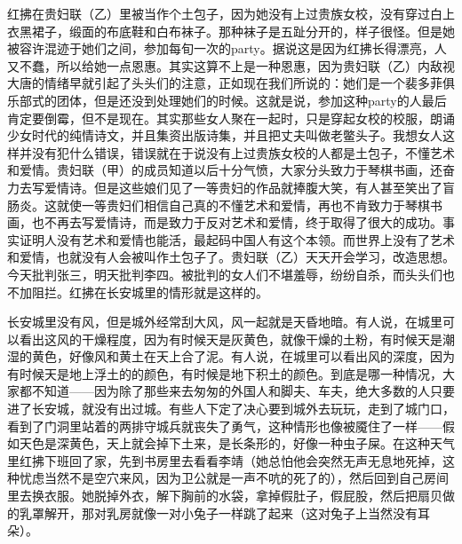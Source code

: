 红拂在贵妇联（乙）里被当作个土包子，因为她没有上过贵族女校，没有穿过白上衣黑裙子，缎面的布底鞋和白布袜子。那种袜子是五趾分开的，样子很怪。但是她被容许混迹于她们之间，参加每旬一次的party。据说这是因为红拂长得漂亮，人又不蠢，所以给她一点恩惠。其实这算不上是一种恩惠，因为贵妇联（乙）内敌视大唐的情绪早就引起了头头们的注意，正如现在我们所说的：她们是一个裴多菲俱乐部式的团体，但是还没到处理她们的时候。这就是说，参加这种party的人最后肯定要倒霉，但不是现在。其实那些女人聚在一起时，只是穿起女校的校服，朗诵少女时代的纯情诗文，并且集资出版诗集，并且把丈夫叫做老鳖头子。我想女人这样并没有犯什么错误，错误就在于说没有上过贵族女校的人都是土包子，不懂艺术和爱情。贵妇联（甲）的成员知道以后十分气愤，大家分头致力于琴棋书画，还奋力去写爱情诗。但是这些娘们见了一等贵妇的作品就捧腹大笑，有人甚至笑出了盲肠炎。这就使一等贵妇们相信自己真的不懂艺术和爱情，再也不肯致力于琴棋书画，也不再去写爱情诗，而是致力于反对艺术和爱情，终于取得了很大的成功。事实证明人没有艺术和爱情也能活，最起码中国人有这个本领。而世界上没有了艺术和爱情，也就没有人会被叫作土包子了。贵妇联（乙）天天开会学习，改造思想。今天批判张三，明天批判李四。被批判的女人们不堪羞辱，纷纷自杀，而头头们也不加阻拦。红拂在长安城里的情形就是这样的。 

长安城里没有风，但是城外经常刮大风，风一起就是天昏地暗。有人说，在城里可以看出这风的干燥程度，因为有时候天是灰黄色，就像干燥的土粉，有时候天是潮湿的黄色，好像风和黄土在天上合了泥。有人说，在城里可以看出风的深度，因为有时候天是地上浮土的的颜色，有时候是地下积土的颜色。到底是哪一种情况，大家都不知道——因为除了那些来去匆匆的外国人和脚夫、车夫，绝大多数的人只要进了长安城，就没有出过城。有些人下定了决心要到城外去玩玩，走到了城门口，看到了门洞里站着的两排守城兵就丧失了勇气，这种情形也像被魇住了一样——假如天色是深黄色，天上就会掉下土来，是长条形的，好像一种虫子屎。在这种天气里红拂下班回了家，先到书房里去看看李靖（她总怕他会突然无声无息地死掉，这种忧虑当然不是空穴来风，因为卫公就是一声不吭的死了的），然后回到自己房间里去换衣服。她脱掉外衣，解下胸前的水袋，拿掉假肚子，假屁股，然后把扇贝做的乳罩解开，那对乳房就像一对小兔子一样跳了起来（这对兔子上当然没有耳朵）。 

